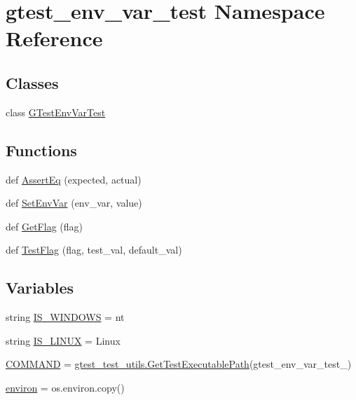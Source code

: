 \hypertarget{namespacegtest__env__var__test}{}\section{gtest\+\_\+env\+\_\+var\+\_\+test Namespace Reference}
\label{namespacegtest__env__var__test}
\subsection*{Classes}
\begin{DoxyCompactItemize}
\item 
class \hyperlink{classgtest__env__var__test_1_1_g_test_env_var_test}{G\+Test\+Env\+Var\+Test}
\end{DoxyCompactItemize}
\subsection*{Functions}
\begin{DoxyCompactItemize}
\item 
def \hyperlink{namespacegtest__env__var__test_a8c94a5abd1117cdd2b402c0059a49a3a}{Assert\+Eq} (expected, actual)
\item 
def \hyperlink{namespacegtest__env__var__test_a634ee0fa1ccf4713411992e7373e49e9}{Set\+Env\+Var} (env\+\_\+var, value)
\item 
def \hyperlink{namespacegtest__env__var__test_a79d5f78f47c7dde37a0941d8604cf857}{Get\+Flag} (flag)
\item 
def \hyperlink{namespacegtest__env__var__test_aa7bb6bbb50ba35349bbdae6d881faee8}{Test\+Flag} (flag, test\+\_\+val, default\+\_\+val)
\end{DoxyCompactItemize}
\subsection*{Variables}
\begin{DoxyCompactItemize}
\item 
string \hyperlink{namespacegtest__env__var__test_af792d1403a09d46bffcd3466821cd0fb}{I\+S\+\_\+\+W\+I\+N\+D\+O\+WS} = \textquotesingle{}nt\textquotesingle{}
\item 
string \hyperlink{namespacegtest__env__var__test_a33b1e2e9afe9d59d75503de4a1297486}{I\+S\+\_\+\+L\+I\+N\+UX} = \textquotesingle{}Linux\textquotesingle{}
\item 
\hyperlink{namespacegtest__env__var__test_a36e02e39934750d022966df31c568a53}{C\+O\+M\+M\+A\+ND} = \hyperlink{namespacegtest__test__utils_a89ed3717984a80ffbb7a9c92f71b86a2}{gtest\+\_\+test\+\_\+utils.\+Get\+Test\+Executable\+Path}(\textquotesingle{}gtest\+\_\+env\+\_\+var\+\_\+test\+\_\+\textquotesingle{})
\item 
\hyperlink{namespacegtest__env__var__test_ac671a59c1b805f7e9511e91380865cda}{environ} = os.\+environ.\+copy()
\end{DoxyCompactItemize}


